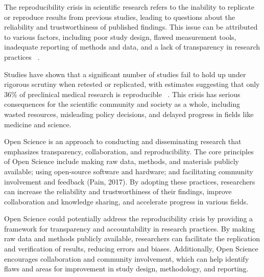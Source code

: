 

The reproducibility crisis in scientific research refers to the inability to replicate or reproduce results from previous studies, leading to questions about the reliability and trustworthiness of published findings. This issue can be attributed to various factors, including poor study design, flawed measurement tools, inadequate reporting of methods and data, and a lack of transparency in research practices ~\cite{freedman_economics_2015}.

Studies have shown that a significant number of studies fail to hold up under rigorous scrutiny when retested or replicated, with estimates suggesting that only 36\% of preclinical medical research is reproducible ~\cite{begley_reproducibility_2015}. This crisis has serious consequences for the scientific community and society as a whole, including wasted resources, misleading policy decisions, and delayed progress in fields like medicine and science.

Open Science is an approach to conducting and disseminating research that emphasizes transparency, collaboration, and reproducibility. The core principles of Open Science include making raw data, methods, and materials publicly available; using open-source software and hardware; and facilitating community involvement and feedback (Pain, 2017). By adopting these practices, researchers can increase the reliability and trustworthiness of their findings, improve collaboration and knowledge sharing, and accelerate progress in various fields.

Open Science could potentially address the reproducibility crisis by providing a framework for transparency and accountability in research practices. By making raw data and methods publicly available, researchers can facilitate the replication and verification of results, reducing errors and biases. Additionally, Open Science encourages collaboration and community involvement, which can help identify flaws and areas for improvement in study design, methodology, and reporting.

